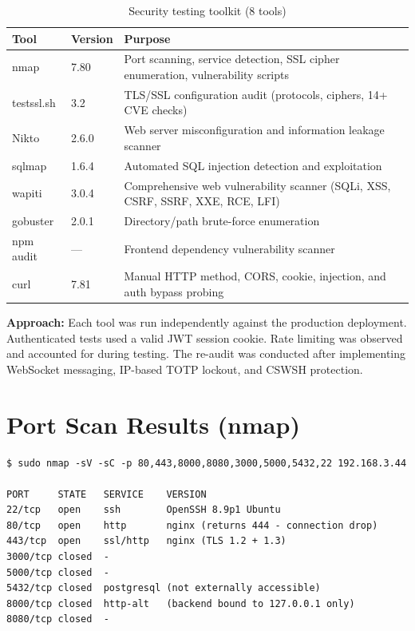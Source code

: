 \documentclass[12pt,a4paper]{article}
\begin{document}
\begin{table}[H]
\centering
\begin{tabularx}{\textwidth}{llX}
\toprule
\textbf{Tool} & \textbf{Version} & \textbf{Purpose} \\
\midrule
nmap & 7.80 & Port scanning, service detection, SSL cipher enumeration, vulnerability scripts \\
testssl.sh & 3.2 & TLS/SSL configuration audit (protocols, ciphers, 14+ CVE checks) \\
Nikto & 2.6.0 & Web server misconfiguration and information leakage scanner \\
sqlmap & 1.6.4 & Automated SQL injection detection and exploitation \\
wapiti & 3.0.4 & Comprehensive web vulnerability scanner (SQLi, XSS, CSRF, SSRF, XXE, RCE, LFI) \\
gobuster & 2.0.1 & Directory/path brute-force enumeration \\
npm audit & --- & Frontend dependency vulnerability scanner \\
curl & 7.81 & Manual HTTP method, CORS, cookie, injection, and auth bypass probing \\
\bottomrule
\end{tabularx}
\caption{Security testing toolkit (8 tools)}
\end{table}

\textbf{Approach:} Each tool was run independently against the production deployment. Authenticated tests used a valid JWT session cookie. Rate limiting was observed and accounted for during testing. The re-audit was conducted after implementing WebSocket messaging, IP-based TOTP lockout, and CSWSH protection.

\section{Port Scan Results (nmap)}

\begin{lstlisting}
$ sudo nmap -sV -sC -p 80,443,8000,8080,3000,5000,5432,22 192.168.3.44

PORT     STATE   SERVICE    VERSION
22/tcp   open    ssh        OpenSSH 8.9p1 Ubuntu
80/tcp   open    http       nginx (returns 444 - connection drop)
443/tcp  open    ssl/http   nginx (TLS 1.2 + 1.3)
3000/tcp closed  -
5000/tcp closed  -
5432/tcp closed  postgresql (not externally accessible)
8000/tcp closed  http-alt   (backend bound to 127.0.0.1 only)
8080/tcp closed  -
\end{lstlisting}
\end{document}
